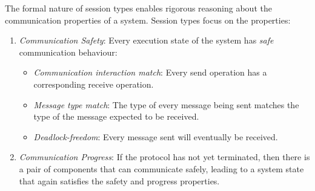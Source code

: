 
The formal nature of session types enables rigorous
reasoning about the communication properties of a system.
Session types %
focus on the %
properties:
%
\begin{enumerate}[label=$\bullet$]
	\item	{\em Communication Safety}: Every execution state of the system has {\em safe} communication behaviour:
	\begin{itemize}
		\item	{\em Communication interaction match}:
				Every send
				operation has a corresponding receive
				operation.
		\item	{\em Message type match}:
				The type of every message being sent matches the type of the message expected to be received.
		\item	{\em Deadlock-freedom}:
				Every message sent will eventually be received.
	\end{itemize}

	\item	{\em Communication Progress}: If the protocol has not yet terminated, then there is a pair of components that can communicate safely, leading to a system state that again satisfies the safety and progress properties.
\end{enumerate}
%

